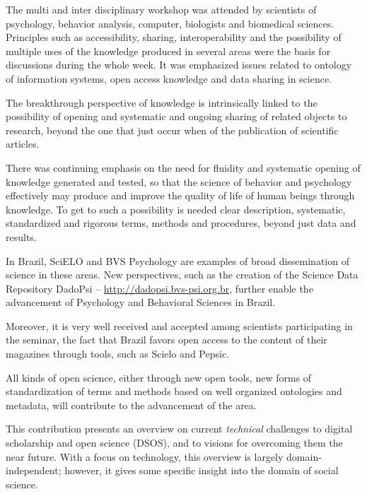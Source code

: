 \documentclass[a4paper,USenglish]{dagrep}
\begin{document}
The multi and inter disciplinary workshop was attended by scientists of 
psychology, behavior analysis, computer, biologists and biomedical sciences. 
Principles such as accessibility, sharing, interoperability and the possibility of 
multiple uses of the knowledge produced in several areas were the basis for 
discussions during the whole week. It was emphasized issues related to 
ontology of information systems, open access knowledge and data sharing in 
science.

The breakthrough perspective of knowledge is intrinsically linked to the 
possibility of opening and systematic and ongoing sharing of related objects to 
research, beyond the one that just occur when of the publication of scientific 
articles.

There was continuing emphasis on the need for fluidity and systematic opening 
of knowledge generated and tested, so that the science of behavior and 
psychology effectively may produce and improve the quality of life of human 
beings through knowledge. To get to such a possibility is needed clear 
description, systematic, standardized and rigorous terms, methods and 
procedures, beyond just data and results.

In Brazil, SciELO and BVS Psychology are examples of broad dissemination of 
science in these areas. New perspectives, such as the creation of the Science 
Data Repository DadoPsi – \url{http://dadopsi.bvs-psi.org.br}, further enable the 
advancement of Psychology and Behavioral Sciences in Brazil.

Moreover, it is very well received and accepted among scientists participating 
in the seminar, the fact that Brazil favors open access to the content of their 
magazines through tools, such as Scielo and Pepsic.

All kinds of open science, either through new open tools, new forms of 
standardization of terms and methods based on well organized ontologies and 
metadata, will contribute to the advancement of the area. 


{}
\license
This contribution presents an overview on current \emph{technical} challenges to
digital scholarship and open science (DSOS), and to visions for overcoming them
the near future.
With a focus on technology, this overview is largely domain-independent;
however, it gives some specific insight into the domain of social science.
\end{document}
